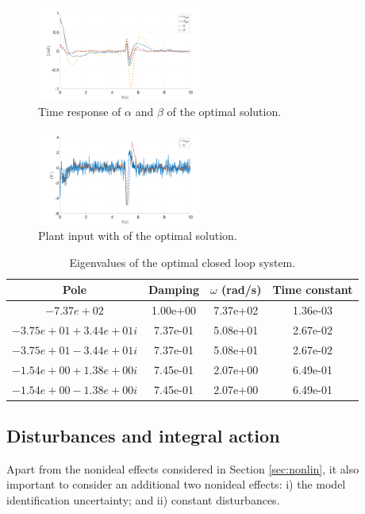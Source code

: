 \documentclass[letterpaper, 10 pt, conference]{ieeeconf}
\begin{document}
\begin{figure}[h]
    \centering
    \includegraphics[width = 0.5\textwidth]{figures/9_5_angles.png}
    \caption{Time response of $\alpha$ and $\beta$ of the optimal solution.}
    \label{fig:9_6_angles}
\end{figure}
\begin{figure}[h]
    \centering
    \includegraphics[width = 0.5\textwidth]{figures/9_5_u.png}
    \caption{Plant input with of the optimal solution.}
    \label{fig:9_6_u}
\end{figure}

\begin{table}[h]
    \centering
    \caption{Eigenvalues of the optimal closed loop system.}
    \begin{tabular}{cccc}
         \hline
         Pole & Damping & $\omega$ (rad/s) & Time constant \\\hline
 $-7.37e+02$            &   1.00e+00      & 7.37e+02       &   1.36e-03    \\
 $-3.75e+01 + 3.44e+01i $    &7.37e-01   &    5.08e+01     &     2.67e-02    \\
 $-3.75e+01 - 3.44e+01i  $ &  7.37e-01    &   5.08e+01     &     2.67e-02    \\
 $-1.54e+00 + 1.38e+00i $  &  7.45e-01    &   2.07e+00  &        6.49e-01    \\
 $-1.54e+00 - 1.38e+00i$  &   7.45e-01    &   2.07e+00     &     6.49e-01 \\
        \hline
    \end{tabular}
    
    \label{tb:cl_poles}
\end{table}



\subsection{Disturbances and integral action}\label{sec:dis}
Apart from the nonideal effects considered in Section \ref{sec:nonlin}, it also important to consider an additional two nonideal effects: i) the model identification uncertainty; and ii) constant disturbances.
\end{document}
